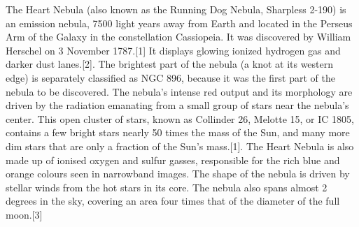 The Heart Nebula (also known as the Running Dog Nebula, Sharpless 2-190) is an emission nebula, 7500 light years away from Earth and located in the Perseus Arm of the Galaxy in the constellation Cassiopeia. It was discovered by William Herschel on 3 November 1787.[1] It displays glowing ionized hydrogen gas and darker dust lanes.[2]. The brightest part of the nebula (a knot at its western edge) is separately classified as NGC 896, because it was the first part of the nebula to be discovered. The nebula's intense red output and its morphology are driven by the radiation emanating from a small group of stars near the nebula's center. This open cluster of stars, known as Collinder 26, Melotte 15, or IC 1805, contains a few bright stars nearly 50 times the mass of the Sun, and many more dim stars that are only a fraction of the Sun's mass.[1]. The Heart Nebula is also made up of ionised oxygen and sulfur gasses, responsible for the rich blue and orange colours seen in narrowband images. The shape of the nebula is driven by stellar winds from the hot stars in its core. The nebula also spans almost 2 degrees in the sky, covering an area four times that of the diameter of the full moon.[3]
